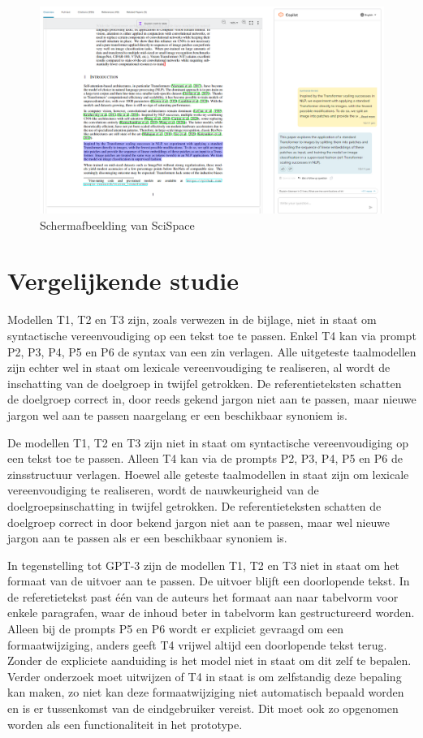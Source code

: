 \begin{figure}[H]
	\includegraphics{img/typeset-example.png}
	\caption{Schermafbeelding van SciSpace}
	\label{img:scispace-example}
\end{figure}

\section{Vergelijkende studie}

Modellen T1, T2 en T3 zijn, zoals verwezen in de bijlage, niet in staat om syntactische vereenvoudiging op een tekst toe te passen. Enkel T4 kan via prompt P2, P3, P4, P5 en P6 de syntax van een zin verlagen. Alle uitgeteste taalmodellen zijn echter wel in staat om lexicale vereenvoudiging te realiseren, al wordt de inschatting van de doelgroep in twijfel getrokken. De referentieteksten schatten de doelgroep correct in, door reeds gekend jargon niet aan te passen, maar nieuwe jargon wel aan te passen naargelang er een beschikbaar synoniem is.

\medspace

De modellen T1, T2 en T3 zijn niet in staat om syntactische vereenvoudiging op een tekst toe te passen. Alleen T4 kan via de prompts P2, P3, P4, P5 en P6 de zinsstructuur verlagen. Hoewel alle geteste taalmodellen in staat zijn om lexicale vereenvoudiging te realiseren, wordt de nauwkeurigheid van de doelgroepsinschatting in twijfel getrokken. De referentieteksten schatten de doelgroep correct in door bekend jargon niet aan te passen, maar wel nieuwe jargon aan te passen als er een beschikbaar synoniem is. 

\medspace

In tegenstelling tot GPT-3 zijn de modellen T1, T2 en T3 niet in staat om het formaat van de uitvoer aan te passen. De uitvoer blijft een doorlopende tekst. In de referetietekst past één van de auteurs het formaat aan naar tabelvorm voor enkele paragrafen, waar de inhoud beter in tabelvorm kan gestructureerd worden. Alleen bij de prompts P5 en P6 wordt er expliciet gevraagd om een formaatwijziging, anders geeft T4 vrijwel altijd een doorlopende tekst terug. Zonder de expliciete aanduiding is het model niet in staat om dit zelf te bepalen. Verder onderzoek moet uitwijzen of T4 in staat is om zelfstandig deze bepaling kan maken, zo niet kan deze formaatwijziging niet automatisch bepaald worden en is er tussenkomst van de eindgebruiker vereist. Dit moet ook zo opgenomen worden als een functionaliteit in het prototype.

